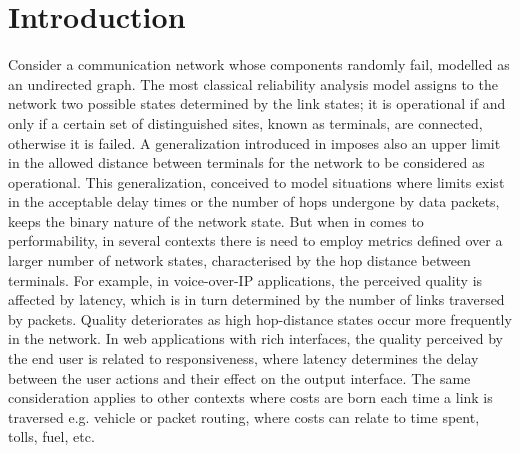 \documentclass[a4paper]{article}
\begin{document}
\makeRT 














\section{Introduction}

Consider a communication network whose components randomly fail, modelled as an undirected graph. The most classical reliability analysis model assigns to the network two possible states determined by the link states; it is operational if and only if a certain set of distinguished sites, known as terminals, are connected, otherwise it is failed. A generalization introduced in \cite{PR01} imposes also an upper limit in the allowed distance between terminals for the network to be considered as operational. This generalization, conceived to model situations where limits exist in the acceptable delay times or the number of hops undergone by data packets, keeps the binary nature of the network state. But when in comes to performability, in several contexts there is need to employ metrics defined over a larger number of network states, characterised by the hop distance between terminals. For example, in voice-over-IP applications, the perceived quality is affected by latency, which is in turn determined by the number of links traversed by packets. Quality deteriorates as high hop-distance states occur more frequently in the network. In web applications with rich interfaces, the quality perceived by the end user is related to responsiveness, where latency determines the delay between the user actions and their effect on the output interface. The same consideration applies to other contexts where costs are born each time a link is traversed e.g. vehicle or packet routing, where costs can relate to time spent, tolls, fuel, etc.  
\end{document}
